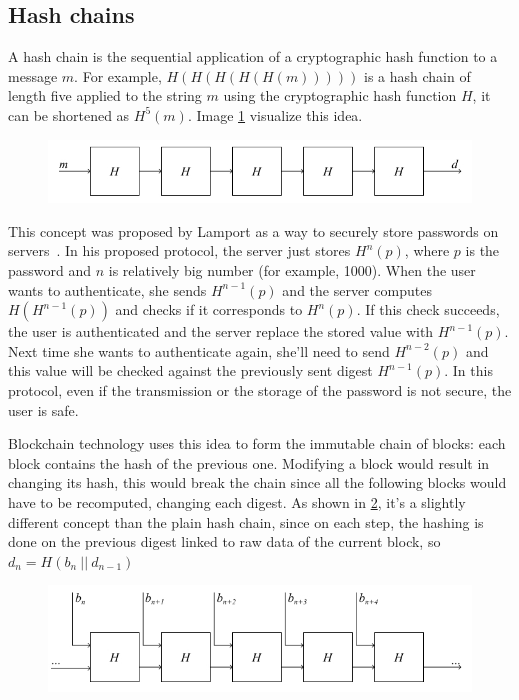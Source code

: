 \subsection{Hash chains}

A hash chain is the sequential application of a cryptographic hash function to a message $m$. For example, $H(H(H(H(H(m)))))$ is a hash chain of length five applied to the string $m$ using the cryptographic hash function $H$, it can be shortened as $H^5(m)$. Image \ref{fig:hash-chain-1} visualize this idea.

\begin{figure}[H]
  \centering
  \includegraphics[width=1\textwidth]{Figures/background/hashchain_1.jpg}
  \caption[Hash chain]{}
  \label{fig:hash-chain-1}
\end{figure}

This concept was proposed by Lamport as a way to securely store passwords on servers~\cite{hashchain}. In his proposed protocol, the server just stores $H^n(p)$, where $p$ is the password and $n$ is relatively big number (for example, 1000). When the user wants to authenticate, she sends $H^{n-1}(p)$ and the server computes $H(H^{n-1}(p))$ and checks if it corresponds to $H^n(p)$. If this check succeeds, the user is authenticated and the server replace the stored value with $H^{n-1}(p)$. Next time she wants to authenticate again, she'll need to send $H^{n-2}(p)$ and this value will be checked against the previously sent digest $H^{n-1}(p)$. In this protocol, even if the transmission or the storage of the password is not secure, the user is safe.

Blockchain technology uses this idea to form the immutable chain of blocks: each block contains the hash of the previous one. Modifying a block would result in changing its hash, this would break the chain since all the following blocks would have to be recomputed, changing each digest. As shown in \ref{fig:hash-chain-2}, it's a slightly different concept than the plain hash chain, since on each step, the hashing is done on the previous digest linked to raw data of the current block, so $d_{n}=H(b_n~||~d_{n-1})$

\begin{figure}[H]
  \centering
  \includegraphics[width=1\textwidth]{Figures/background/hashchain_2.jpg}
  \caption[Hash chain in blockchain]{}
  \label{fig:hash-chain-2}
\end{figure}

